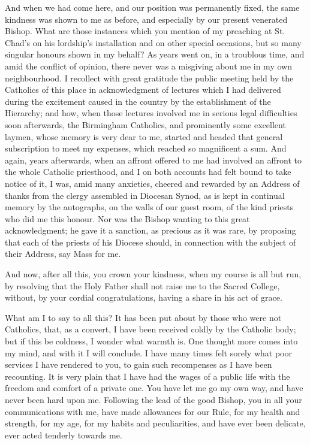And when we had come here, and our position was permanently fixed,
the same kindness was shown to me as before, and especially by our
present venerated Bishop. What are those instances which you mention
of my preaching at St. Chad's on his lordship's installation and on
other special occasions, but so many singular honours shown in my
behalf? As years went on, in a troublous time, and amid the conflict
of opinion, there never was a misgiving about me in my own
neighbourhood. I recollect with great gratitude the public meeting
held by the Catholics of this place in acknowledgment of lectures
which I had delivered during the excitement caused in the country by
the establishment of the Hierarchy; and how, when those lectures
involved me in serious legal difficulties soon afterwards, the
Birmingham Catholics, and prominently some excellent laymen, whose
memory is very dear to me, started and headed that general
subscription to meet my expenses, which reached so magnificent a
sum. And again, years afterwards, when an affront offered to me had
involved an affront to the whole Catholic priesthood, and I on both
accounts had felt bound to take notice of it, I was, amid many
anxieties, cheered and rewarded by an Address of thanks from the
clergy assembled in Diocesan Synod, as is kept in continual memory by
the autographs, on the walls of our guest room, of the kind priests
who did me this honour. Nor was the Bishop wanting to this great
acknowledgment; he gave it a sanction, as precious as it was rare, by
proposing that each of the priests of his Diocese should, in
connection with the subject of their Address, say Mass for me.

And now, after all this, you crown your kindness, when my course is
all but run, by resolving that the Holy Father shall not raise me to
the Sacred College, without, by your cordial congratulations, having a
share in his act of grace.

What am I to say to all this? It has been put about by those who
were not Catholics, that, as a convert, I have been received coldly by
the Catholic body; but if this be coldness, I wonder what warmth is.
One thought more comes into my mind, and with it I will
conclude. I have many times felt sorely what poor services I have
rendered to you, to gain such recompenses as I have been recounting.
It is very plain that I have had the wages of a public life with the
freedom and comfort of a private one. You have let me go my own way,
and have never been hard upon me. Following the lead of the good
Bishop, you in all your communications with me, have made allowances
for our Rule, for my health and strength, for my age, for my habits
and peculiarities, and have ever been delicate, ever acted tenderly
towards me.

